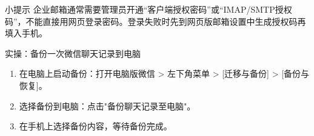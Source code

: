 \begin{tcbinfo}{小提示}
企业邮箱通常需要管理员开通“客户端授权密码”或“IMAP/SMTP授权码”，不能直接用网页登录密码。登录失败时先到网页版邮箱设置中生成授权码再填入手机。

\end{tcbinfo}

\begin{tcbpractice}{实操：备份一次微信聊天记录到电脑}
\begin{enumerate}
  \item 在电脑上启动备份：打开电脑版微信 > 左下角菜单 > [迁移与备份] > [备份与恢复]。
  \item 选择备份到电脑：点击"备份聊天记录至电脑"。
  \item 在手机上选择备份内容，等待备份完成。
\end{enumerate}

\end{tcbpractice}
